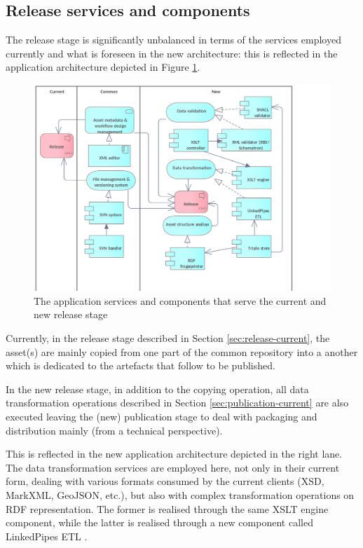 	\subsection{Release services and components}
	\label{sec:release-application}	
	
	The release stage is significantly unbalanced in terms of the services employed currently and what is foreseen in the new architecture: this is reflected in the application architecture depicted in Figure \ref{fig:application-release}. 
	
	\begin{figure}[h]
		\centering
		\includegraphics[width=.9\textwidth]{images/application/Release v3.png}
		\caption{The application services and components that serve the current and new release stage}
		\label{fig:application-release}
	\end{figure}

	Currently, in the release stage described in Section \ref{sec:release-current}, the asset(s) are mainly copied from one part of the common repository into a another which is dedicated to the artefacts that follow to be published. 
	
	In the new release stage, in addition to the copying operation, all data transformation operations described in Section \ref{sec:publication-current} are also executed leaving the (new) publication stage to deal with packaging and distribution mainly (from a technical perspective).
	
	This is reflected in the new application architecture depicted in the right lane. The data transformation services are employed here, not only in their current form, dealing with various formats consumed by the current clients (XSD, MarkXML, GeoJSON, etc.), but also with complex transformation operations on RDF representation. The former is realised through the same XSLT engine component, while the latter is realised through a new component called LinkedPipes ETL \citep{linkedpipes-klimek2016linkedpipes,linkedpipes-klimek2017linkedpipes}.
	
